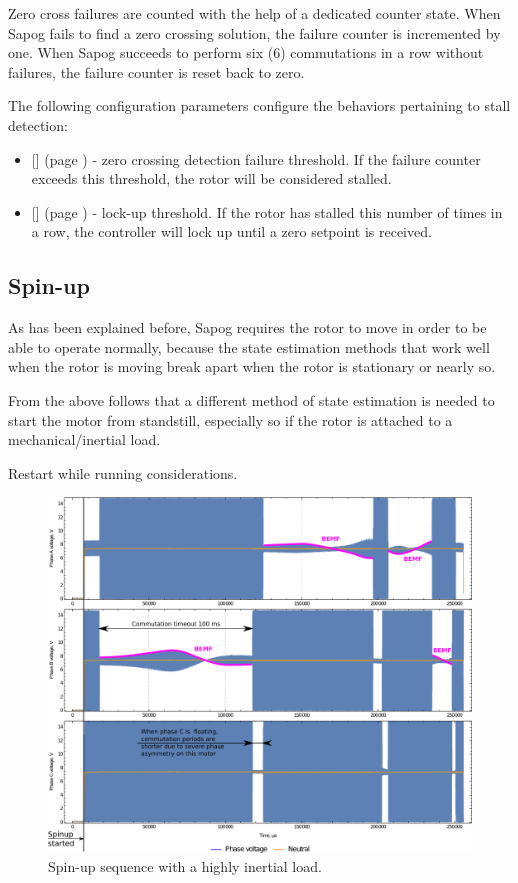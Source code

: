 \documentclass{zubaxdoc}
\newcommand{\CfgRef}[1]{
    \StrSubstitute{#1}{+}{\textunderscore}[\temp]
    \texttt{\temp} {\footnotesize (page \pageref{#1})}
}
\begin{document}
Zero cross failures are counted with the help of a dedicated counter state.
When Sapog fails to find a zero crossing solution,
the failure counter is incremented by one.
When Sapog succeeds to perform six (6) commutations in a row without failures,
the failure counter is reset back to zero.

The following configuration parameters configure the behaviors pertaining to stall detection:

\begin{itemize}
\item \CfgRef{mot+zc+fails+max} - zero crossing detection failure threshold.
If the failure counter exceeds this threshold, the rotor will be considered stalled.
\item \CfgRef{mot+stop+thres} - lock-up threshold.
If the rotor has stalled this number of times in a row,
the controller will lock up until a zero setpoint is received.
\end{itemize}

\subsection{Spin-up}

As has been explained before, Sapog requires the rotor to move in order to be able to operate normally,
because the state estimation methods that work well when the rotor is moving break apart when the rotor is
stationary or nearly so.

From the above follows that a different method of state estimation is needed to start the motor
from standstill, especially so if the rotor is attached to a mechanical/inertial load.



Restart while running considerations.

\begin{figure}[hbt]
    \centering
	\includegraphics[width=\textwidth]{spinup_phase_voltages}
	\caption{Spin-up sequence with a highly inertial load.
	\label{spinup_phase_voltages}}
\end{figure}
\end{document}
